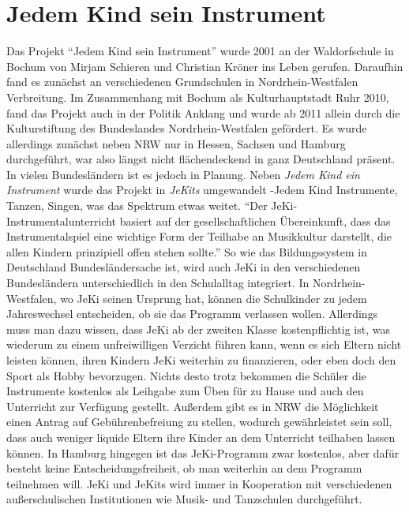 \section{Jedem Kind sein Instrument}

Das Projekt \enquote{Jedem Kind sein Instrument} wurde 2001 an der Waldorfschule
in Bochum von Mirjam Schieren und Christian Kröner ins Leben gerufen. Daraufhin
fand es zunächst an verschiedenen Grundschulen in Nordrhein-Westfalen
Verbreitung. Im Zusammenhang mit Bochum als Kulturhauptstadt Ruhr 2010, fand das
Projekt auch in der Politik Anklang und wurde ab 2011 allein durch die
Kulturstiftung des Bundeslandes Nordrhein-Westfalen gefördert. Es wurde
allerdings zunächst neben NRW nur in Hessen, Sachsen und Hamburg durchgeführt,
war also längst nicht flächendeckend in ganz Deutschland präsent. In vielen
Bundesländern ist es jedoch in Planung. Neben \emph{Jedem Kind ein Instrument}
wurde das Projekt in \emph{JeKits} umgewandelt -Jedem Kind Instrumente, Tanzen,
Singen, was das Spektrum etwas weitet. \enquote{Der JeKi-Instrumentalunterricht
basiert auf der gesellschaftlichen Übereinkunft, dass das Instrumentalspiel eine
wichtige Form der Teilhabe an Musikkultur darstellt, die allen Kindern
prinzipiell offen stehen sollte.}\autocite[94]{krupp_schleussner:jeki} So wie
das Bildungssystem in Deutschland Bundesländersache ist, wird auch JeKi in den
verschiedenen Bundesländern unterschiedlich in den Schulalltag integriert. In
Nordrhein-Westfalen, wo JeKi seinen Ursprung hat, können die Schulkinder zu
jedem Jahreswechsel entscheiden, ob sie das Programm verlassen wollen.
\autocite[95]{krupp_schleussner:jeki} Allerdings muss man dazu wissen, dass JeKi
ab der zweiten Klasse kostenpflichtig ist, was wiederum zu einem unfreiwilligen
Verzicht führen kann, wenn es sich Eltern nicht leisten können, ihren Kindern
JeKi weiterhin zu finanzieren, oder eben doch den Sport als Hobby bevorzugen.
Nichts desto trotz bekommen die Schüler die Instrumente kostenlos als Leihgabe
zum Üben für zu Hause und auch den Unterricht zur Verfügung gestellt. Außerdem
gibt es in NRW die Möglichkeit einen Antrag auf Gebührenbefreiung zu stellen,
wodurch gewährleistet sein soll, dass auch weniger liquide Eltern ihre Kinder an
dem Unterricht teilhaben lassen können. In Hamburg hingegen ist das
JeKi-Programm zwar kostenlos, aber dafür besteht keine Entscheidungsfreiheit, ob
man weiterhin an dem Programm teilnehmen will.
\autocite[95]{krupp_schleussner:jeki}
JeKi und JeKits wird immer in Kooperation mit verschiedenen außerschulischen
Institutionen wie Musik- und Tanzschulen durchgeführt.


